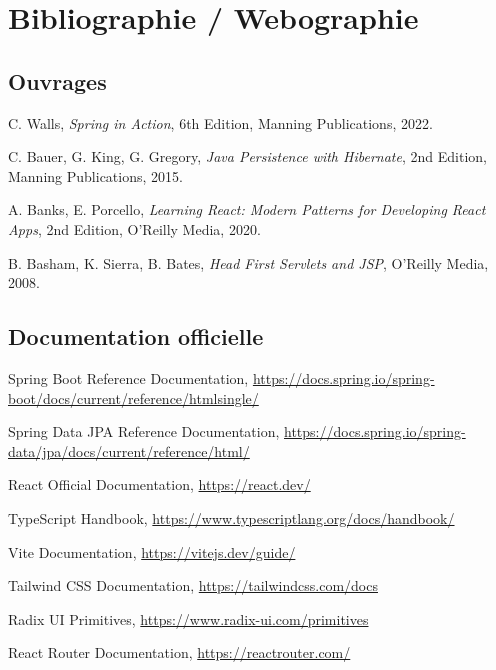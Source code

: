 \chapter*{Bibliographie / Webographie}

\section*{Ouvrages}

\begin{enumerate}[label={[\arabic*]},noitemsep]
    \item C. Walls, \textit{Spring in Action}, 6th Edition, Manning Publications, 2022.
    \item C. Bauer, G. King, G. Gregory, \textit{Java Persistence with Hibernate}, 2nd Edition, Manning Publications, 2015.
    \item A. Banks, E. Porcello, \textit{Learning React: Modern Patterns for Developing React Apps}, 2nd Edition, O'Reilly Media, 2020.
    \item B. Basham, K. Sierra, B. Bates, \textit{Head First Servlets and JSP}, O'Reilly Media, 2008.
\end{enumerate}

\section*{Documentation officielle}

\begin{enumerate}[label={[\arabic*]},noitemsep,start=5]
    \item Spring Boot Reference Documentation, \url{https://docs.spring.io/spring-boot/docs/current/reference/htmlsingle/}
    \item Spring Data JPA Reference Documentation, \url{https://docs.spring.io/spring-data/jpa/docs/current/reference/html/}
    \item React Official Documentation, \url{https://react.dev/}
    \item TypeScript Handbook, \url{https://www.typescriptlang.org/docs/handbook/}
    \item Vite Documentation, \url{https://vitejs.dev/guide/}
    \item Tailwind CSS Documentation, \url{https://tailwindcss.com/docs}
    \item Radix UI Primitives, \url{https://www.radix-ui.com/primitives}
    \item React Router Documentation, \url{https://reactrouter.com/}
\end{enumerate}

